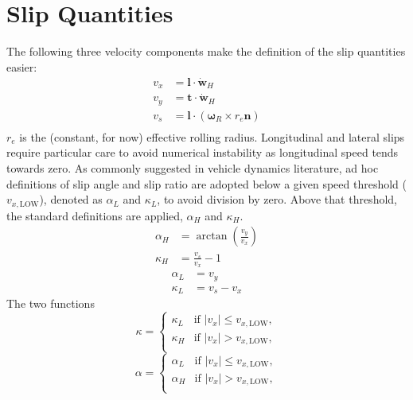 \section{Slip Quantities}

The following three velocity components make the definition of the slip quantities easier:
\begin{equation}
    \begin{split}
        v_x &= \mathbf{l} \cdot \dot{\mathbf{w}}_H\\
        v_y &= \mathbf{t} \cdot \dot{\mathbf{w}}_H\\
        v_s &= \mathbf{l} \cdot \left(\boldsymbol{\omega}_R \times r_e \mathbf{n}\right)\\
    \end{split}
\end{equation}
$r_e$ is the (constant, for now) effective rolling radius.
Longitudinal and lateral slips require particular care to avoid numerical instability as longitudinal speed tends towards zero. As commonly suggested in vehicle dynamics literature, ad hoc definitions of slip angle and slip ratio are adopted below a given speed threshold ($v_{x, \text{LOW}}$), denoted as $\alpha_L$ and $\kappa_L$, to avoid division by zero. Above that threshold, the standard definitions are applied, $\alpha_H$ and $\kappa_H$.
\begin{equation}
    \begin{split}
        \alpha_H &= \arctan\left(\frac{v_y}{v_x}\right)\\
        \kappa_H &= \frac{v_s}{v_x} - 1
    \end{split}
\end{equation}
\begin{equation}
    \begin{split}
        \alpha_L &= v_y\\
        \kappa_L &= v_s - v_x
    \end{split}
\end{equation}
The two functions
\begin{equation}
    \kappa = 
    \begin{cases} 
        \kappa_L & \text{if } |v_x| \leq v_{x,\text{LOW}}, \\
        \kappa_H & \text{if } |v_x| > v_{x,\text{LOW}}, \\
    \end{cases}
\end{equation}
\begin{equation}
    \alpha = 
    \begin{cases} 
        \alpha_L & \text{if } |v_x| \leq v_{x,\text{LOW}}, \\
        \alpha_H & \text{if } |v_x| > v_{x,\text{LOW}}, \\
    \end{cases}
\end{equation} 
